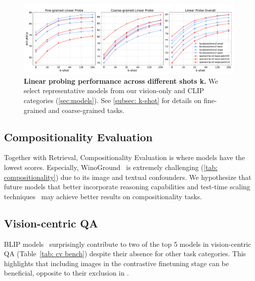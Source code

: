 \begin{figure}[h]
\centering
\includegraphics[width=1\linewidth]{figures/k-shot.pdf}
\caption{\textbf{Linear probing performance across different shots k.} We select representative models from our vision-only and CLIP categories (\autoref{sec:models}). See \autoref{subsec: k-shot} for details on fine-grained and coarse-grained tasks.}
\label{fig: k-shot linear probe}
\end{figure}

\subsection{Compositionality Evaluation}
\label{subsec: compositionality}

Together with Retrieval, Compositionality Evaluation is where models have the lowest scores. Especially, WinoGround~\citep{Thrush_2022_CVPR} is extremely challenging (\autoref{tab: compositionality}) due to its image and textual confounders. We hypothesize that future models that better incorporate reasoning capabilities and test-time scaling techniques~\citep{jaech2024openai,guo2025deepseek,xu2024llava,lu2025retro,muennighoff2025s1} may achieve better results on compositionality tasks.

\subsection{Vision-centric QA}
\label{subsec: cv-centric tasks}

BLIP models~\citep{li2022blip,li2023blip2} surprisingly contribute to two of the top 5 models in vision-centric QA (Table~\ref{tab: cv bench}) despite their absence for other task categories. This highlights that including images in the contrastive finetuning stage can be beneficial, opposite to their exclusion in \citet{jiang2024e5}.
